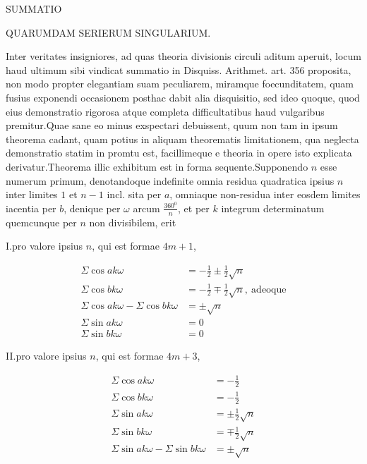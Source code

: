 %
\begin{center}\Large SUMMATIO\end{center}

\begin{center}\large QUARUMDAM SERIERUM SINGULARIUM.\end{center}

\BookRule{22mm}


Inter veritates insigniores, ad quas theoria divisionis circuli aditum aperuit, locum haud ultimum sibi vindicat summatio in Disquiss. Arithmet. art. 356 proposita, non modo propter elegantiam suam peculiarem, miramque foecunditatem, quam fusius exponendi occasionem posthac dabit alia disquisitio, sed ideo quoque, quod eius demonstratio rigorosa atque completa difficultatibus haud vulgaribus premitur.\quad Quae sane eo minus exspectari debuissent, quum non tam in ipsum theorema cadant, quam potius in aliquam theorematis limitationem, qua neglecta demonstratio statim in promtu est, facillimeque e theoria in opere isto explicata derivatur.\quad Theorema illic exhibitum est in forma sequente.\quad Supponendo $n$ esse numerum primum, denotandoque indefinite omnia residua quadratica ipsius $n$ inter limites $1$ et $n-1$ incl. sita per $a$, omniaque non-residua inter eosdem limites iacentia per $b$, denique per $\omega$ arcum $\frac{360^{0}}{n}$, et per $k$ integrum determinatum quemcunque per $n$ non divisibilem, erit

I.\quad pro valore ipsius $n$, qui est formae $4m+1$,

\[
\begin{aligned}
\Sigma\cos ak\omega&=-\tfrac12\pm\tfrac12\surd n\\
\Sigma\cos bk\omega&=-\tfrac12\mp\tfrac12\surd n,\ \text{adeoque}\\
\Sigma\cos ak\omega-\Sigma\cos bk\omega&=\pm\surd n\\
\Sigma\sin ak\omega&=0\\
\Sigma\sin bk\omega&=0
\end{aligned}
\]

%
II.\quad pro valore ipsius $n$, qui est formae $4m+3$,

\[
\begin{aligned}
\Sigma\cos ak\omega&=-\tfrac12\\
\Sigma\cos bk\omega&=-\tfrac12\\
\Sigma\sin ak\omega&=\pm\tfrac12\surd n\\
\Sigma\sin bk\omega&=\mp\tfrac12\surd n\\
\Sigma\sin ak\omega-\Sigma\sin bk\omega&=\pm\surd n
\end{aligned}
\]


